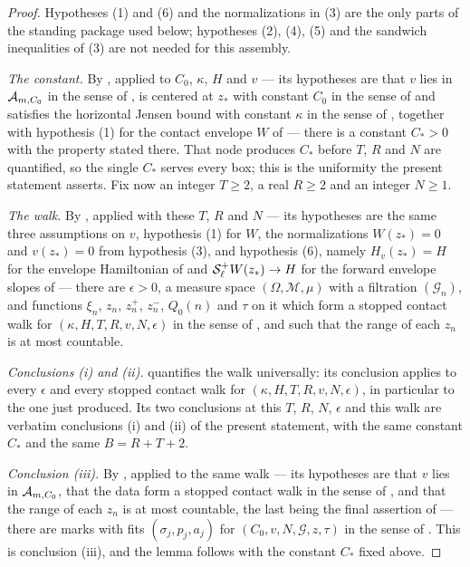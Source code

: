 \begin{proof}
Hypotheses (1) and (6) and the normalizations in (3) are the only parts of the
standing package used below; hypotheses (2), (4), (5) and the sandwich
inequalities of (3) are not needed for this assembly.

\emph{The constant.} By , applied to $C_0$, $\kappa$,
$H$ and $v$ --- its hypotheses are that $v$ lies in $\mathcal{A}_{m,C_0}$ in the
sense of , is centered at $z_*$ with constant $C_0$ in the
sense of  and satisfies the horizontal Jensen bound with
constant $\kappa$ in the sense of , together with
hypothesis (1) for the contact envelope $W$ of  --- there is
a constant $C_*>0$ with the property stated there. That node produces $C_*$
before $T$, $R$ and $N$ are quantified, so the single $C_*$ serves every box;
this is the uniformity the present statement asserts. Fix now an integer
$T\ge2$, a real $R\ge2$ and an integer $N\ge1$.

\emph{The walk.} By , applied with these $T$, $R$ and
$N$ --- its hypotheses are the same three assumptions on $v$, hypothesis (1) for
$W$, the normalizations $W(z_*)=0$ and $v(z_*)=0$ from hypothesis (3), and
hypothesis (6), namely $H_v(z_*)=H$ for the envelope Hamiltonian of
 and $\mathcal{S}^+_\ell W(z_*)\to H$ for the forward envelope
slopes of  --- there are $\epsilon>0$, a measure space
$(\Omega,\mathcal M,\mu)$ with a filtration $(\mathcal G_n)$, and functions
$\xi_n$, $z_n$, $z^+_n$, $z^-_n$, $Q_0(n)$ and $\tau$ on it which form a stopped
contact walk for $(\kappa,H,T,R,v,N,\epsilon)$ in the sense of
, and such that the range of each $z_n$ is at most
countable.

\emph{Conclusions (i) and (ii).}  quantifies the
walk universally: its conclusion applies to every $\epsilon$ and every stopped
contact walk for $(\kappa,H,T,R,v,N,\epsilon)$, in particular to the one just
produced. Its two conclusions at this $T$, $R$, $N$, $\epsilon$ and this walk are
verbatim conclusions (i) and (ii) of the present statement, with the same
constant $C_*$ and the same $B=R+T+2$.

\emph{Conclusion (iii).} By , applied to the same
walk --- its hypotheses are that $v$ lies in $\mathcal{A}_{m,C_0}$, that the data
form a stopped contact walk in the sense of , and that the
range of each $z_n$ is at most countable, the last being the final assertion of
 --- there are marks with fits
$(\sigma_j,p_j,a_j)$ for $(C_0,v,N,\mathcal G,z,\tau)$ in the sense of
. This is conclusion (iii), and the lemma follows with the
constant $C_*$ fixed above. \end{proof}
